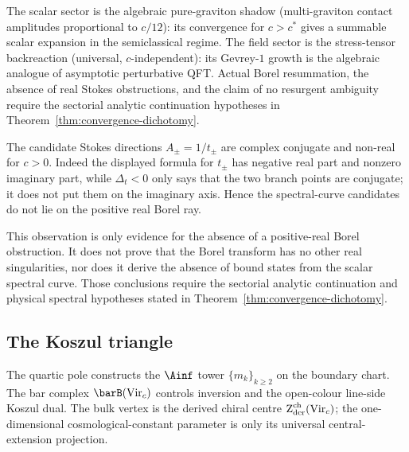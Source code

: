 \begin{remark}
\label{rem:convergence-dichotomy-physics}
The scalar sector is the algebraic pure-graviton shadow
(multi-graviton contact amplitudes proportional to \(c/12\)): its
convergence for \(c > c^*\) gives a summable scalar expansion in the
semiclassical regime. The field sector is the stress-tensor
backreaction (universal, \(c\)-independent): its Gevrey-\(1\) growth
is the algebraic analogue of asymptotic perturbative QFT. Actual
Borel resummation, the absence of real Stokes obstructions, and the
claim of no resurgent ambiguity require the sectorial analytic
continuation hypotheses in Theorem~\ref{thm:convergence-dichotomy}.
\end{remark}

\begin{remark}%
\label{rem:instanton-imaginary}%
%
%
The candidate Stokes directions \(A_\pm = 1/t_\pm\) are complex
conjugate and non-real for \(c>0\). Indeed the displayed formula for
\(t_\pm\) has negative real part and nonzero imaginary part, while
\(\Delta_t<0\) only says that the two branch points are conjugate; it
does not put them on the imaginary axis. Hence the spectral-curve
candidates do not lie on the positive real Borel ray.

This observation is only evidence for the absence of a positive-real
Borel obstruction. It does not prove that the Borel transform has no
other real singularities, nor does it derive the absence of bound
states from the scalar spectral curve. Those conclusions require the
sectorial analytic continuation and physical spectral hypotheses
stated in Theorem~\ref{thm:convergence-dichotomy}.
\end{remark}


\subsection{The Koszul triangle}
\label{subsec:gravity-koszul}

The quartic pole constructs the $\Ainf$ tower $\{m_k\}_{k \ge 2}$ on
the boundary chart.  The bar complex \(\barB(\mathrm{Vir}_c)\)
controls inversion and the open-colour line-side Koszul dual.  The
bulk vertex is the derived chiral centre
\(\operatorname{Z}_{\mathrm{der}}^{\mathrm{ch}}(\mathrm{Vir}_c)\); the one-dimensional
cosmological-constant parameter is only its universal
central-extension projection.

